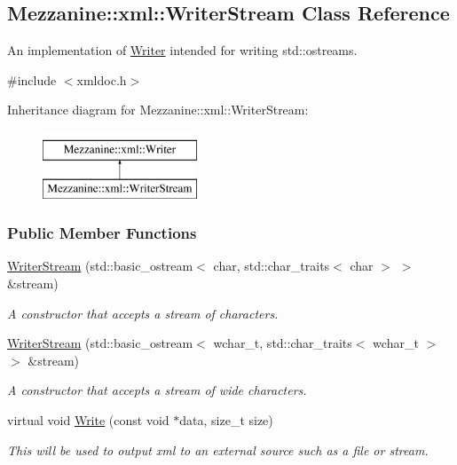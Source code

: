 \hypertarget{classMezzanine_1_1xml_1_1WriterStream}{
\subsection{Mezzanine::xml::WriterStream Class Reference}
\label{classMezzanine_1_1xml_1_1WriterStream}
}


An implementation of \hyperlink{classMezzanine_1_1xml_1_1Writer}{Writer} intended for writing std::ostreams.  




{\ttfamily \#include $<$xmldoc.h$>$}

Inheritance diagram for Mezzanine::xml::WriterStream:\begin{figure}[H]
\begin{center}
\leavevmode
\includegraphics[height=2.000000cm]{classMezzanine_1_1xml_1_1WriterStream}
\end{center}
\end{figure}
\subsubsection*{Public Member Functions}
\begin{DoxyCompactItemize}
\item 
\hyperlink{classMezzanine_1_1xml_1_1WriterStream_acb74230770bad1f07247a9bf41648c2b}{WriterStream} (std::basic\_\-ostream$<$ char, std::char\_\-traits$<$ char $>$ $>$ \&stream)
\begin{DoxyCompactList}\small\item\em A constructor that accepts a stream of characters. \item\end{DoxyCompactList}\item 
\hyperlink{classMezzanine_1_1xml_1_1WriterStream_a4ff187442067cfe0d52100e06b95927c}{WriterStream} (std::basic\_\-ostream$<$ wchar\_\-t, std::char\_\-traits$<$ wchar\_\-t $>$ $>$ \&stream)
\begin{DoxyCompactList}\small\item\em A constructor that accepts a stream of wide characters. \item\end{DoxyCompactList}\item 
virtual void \hyperlink{classMezzanine_1_1xml_1_1WriterStream_a53f87cb74410ab9b0abec39222d32d9f}{Write} (const void $\ast$data, size\_\-t size)
\begin{DoxyCompactList}\small\item\em This will be used to output xml to an external source such as a file or stream. \item\end{DoxyCompactList}\end{DoxyCompactItemize}


